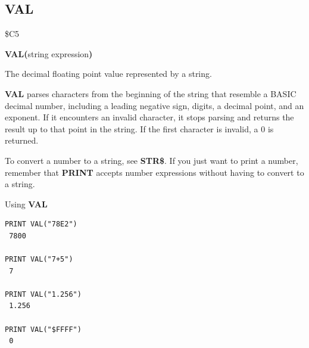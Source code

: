 \subsection{VAL}
\begin{description}[leftmargin=2cm,style=nextline]
\item [Token:]    \$C5

\item [Format:]   {\bf VAL(}string expression{\bf)}

\item [Returns:]  The decimal floating point value represented by a string.

\item [Remarks:]  {\bf VAL} parses characters from the beginning of the string that resemble a BASIC decimal number, including a leading negative sign, digits, a decimal point, and an exponent. If it encounters an invalid character, it stops parsing and returns the result up to that point in the string. If the first character is invalid, a 0 is returned.

                  To convert a number to a string, see {\bf STR\$}. If you just want to print a number, remember that {\bf PRINT} accepts number expressions without having to convert to a string.

\item [Example:]  Using {\bf VAL}

\begin{tcolorbox}[colback=black,coltext=white]
\verbatimfont{\codefont}
\begin{verbatim}
PRINT VAL("78E2")
 7800

PRINT VAL("7+5")
 7

PRINT VAL("1.256")
 1.256

PRINT VAL("$FFFF")
 0
\end{verbatim}
\end{tcolorbox}
\end{description}


\newpage
